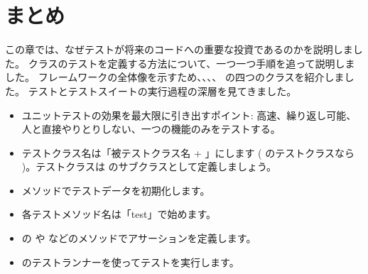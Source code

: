 \documentclass[a4paper,10pt,twoside]{book}
\begin{document}



\section{まとめ}

この章では、なぜテストが将来のコードへの重要な投資であるのかを説明しました。
 クラスのテストを定義する方法について、一つ一つ手順を追って説明しました。
\sunit フレームワークの全体像を示すため、、、、 の四つのクラスを紹介しました。
テストとテストスイートの実行過程の深層を見てきました。

\begin{itemize}
  \item ユニットテストの効果を最大限に引き出すポイント: 高速、繰り返し可能、人と直接やりとりしない、一つの機能のみをテストする。
  \item テストクラス名は「被テストクラス名 + 」にします ( のテストクラスなら )。テストクラスは  のサブクラスとして定義しましょう。
  \item {} メソッドでテストデータを初期化します。
  \item 各テストメソッド名は「test」で始めます。
  \item {} の  や  などのメソッドでアサーションを定義します。
  \item \sunit のテストランナーを使ってテストを実行します。%
\end{itemize}

\ifx\wholebook\relax\else
   
   
\end{document}
